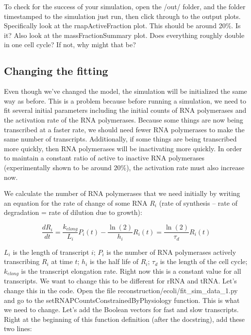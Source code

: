 \documentclass[12pt]{article}
\begin{document}
To check for the success of your simulation, open the /out/ folder, and the folder timestamped to the simulation just run, then click through to the output plots. Specifically look at the rnapActiveFraction plot. This should be around 20\%. Is it? Also look at the massFractionSummary plot. Does everything roughly double in one cell cycle? If not, why might that be?

\subsection{Changing the fitting}

Even though we've changed the model, the simulation will be initialized the same way as before. This is a problem because before running a simulation, we need to fit several initial parameters including the initial counts of RNA polymerases and the activation rate of the RNA polymerases. Because some things are now being transcribed at a faster rate, we should need fewer RNA polymerases to make the same number of transcripts. Additionally, if some things are being transcribed more quickly, then RNA polymerases will be inactivating more quickly. In order to maintain a constant ratio of active to inactive RNA polymerases (experimentally shown to be around 20\%), the activation rate must also increase now. 

\par

We calculate the number of RNA polymerases that we need initially by writing an equation for the rate of change of some RNA $R_i$ (rate of synthesis – rate of degradation = rate of dilution due to growth):

$$
\frac{d R_i}{dt} = \frac{k_{elong}}{L_i}P_i(t) - \frac{\ln(2)}{h_i}R_i(t) = \frac{\ln(2)}{\tau_d}R_i(t)
$$


$L_i$ is the length of transcript $i$; $P_i$ is the number of RNA polymerases actively transcribing $R_i$ at time $t$; $h_i$ is the half life of $R_i$; $\tau_d$ is the length of the cell cycle; $k_{elong}$ is the transcript elongation rate. Right now this is a constant value for all transcripts. We want to change this to be different for rRNA and tRNA. Let’s change this in the code. Open the file reconstruction/ecoli/fit_sim_data_1.py and go to the setRNAPCountsConstrainedByPhysiology function. This is what we need to change. Let’s add the Boolean vectors for fast and slow transcripts. Right at the beginning of this function definition (after the docstring), add these two lines:
\end{document}
